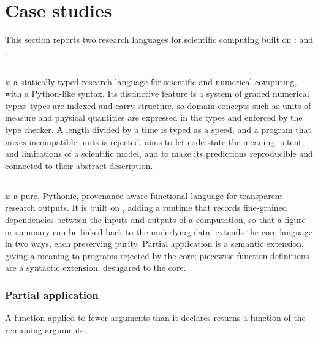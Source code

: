 \section{Case studies}
\label{sec:case-studies}

This section reports two research languages for scientific computing built on \PurePy: \Fortl and \Fluid{}.

\subsection{\Fortl}
\label{sec:case-study-fortl}

\Fortl is a statically-typed research language for scientific and numerical computing, with a Python-like
syntax. Its distinctive feature is a system of graded numerical types: types are indexed and carry structure,
so domain concepts such as units of measure and physical quantities are expressed in the types and enforced by
the type checker. A length divided by a time is typed as a speed, and a program that mixes incompatible units
is rejected. \Fortl aims to let code state the meaning, intent, and limitations of a scientific model, and to
make its predictions reproducible and connected to their abstract description. 

\subsection{\Fluid}
\label{sec:case-study-fluid}

\Fluid is a pure, Pythonic, provenance-aware functional language for transparent research outputs. It is built
on \PurePy, adding a runtime that records fine-grained dependencies between the inputs and outputs of a
computation, so that a figure or summary can be linked back to the underlying data. \Fluid extends the core
language in two ways, each preserving purity. Partial application is a semantic extension, giving a meaning to
programs rejected by the core; piecewise function definitions are a syntactic extension, desugared to the
core.

\subsubsection{Partial application}
\label{sec:extension-partial-application}

A function applied to fewer arguments than it declares returns a function of the remaining arguments:

